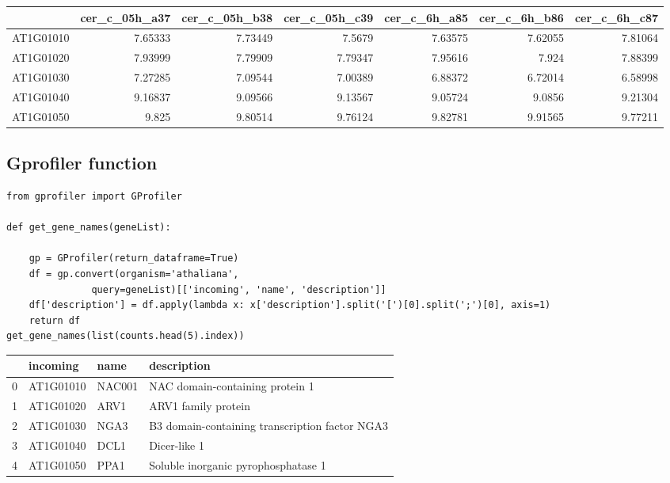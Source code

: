 \documentclass[11pt]{article}
\begin{document}
\begin{center}
\begin{tabular}{lrrrrrr}
 & cer\_c\_05h\_a37 & cer\_c\_05h\_b38 & cer\_c\_05h\_c39 & cer\_c\_6h\_a85 & cer\_c\_6h\_b86 & cer\_c\_6h\_c87\\
\hline
AT1G01010 & 7.65333 & 7.73449 & 7.5679 & 7.63575 & 7.62055 & 7.81064\\
AT1G01020 & 7.93999 & 7.79909 & 7.79347 & 7.95616 & 7.924 & 7.88399\\
AT1G01030 & 7.27285 & 7.09544 & 7.00389 & 6.88372 & 6.72014 & 6.58998\\
AT1G01040 & 9.16837 & 9.09566 & 9.13567 & 9.05724 & 9.0856 & 9.21304\\
AT1G01050 & 9.825 & 9.80514 & 9.76124 & 9.82781 & 9.91565 & 9.77211\\
\end{tabular}
\end{center}

\subsection{Gprofiler function}
\label{sec:org108e342}
\begin{verbatim}
from gprofiler import GProfiler

def get_gene_names(geneList):

    gp = GProfiler(return_dataframe=True)
    df = gp.convert(organism='athaliana',
               query=geneList)[['incoming', 'name', 'description']]
    df['description'] = df.apply(lambda x: x['description'].split('[')[0].split(';')[0], axis=1)
    return df
get_gene_names(list(counts.head(5).index))
\end{verbatim}

\begin{center}
\begin{tabular}{rlll}
 & incoming & name & description\\
\hline
0 & AT1G01010 & NAC001 & NAC domain-containing protein 1\\
1 & AT1G01020 & ARV1 & ARV1 family protein\\
2 & AT1G01030 & NGA3 & B3 domain-containing transcription factor NGA3\\
3 & AT1G01040 & DCL1 & Dicer-like 1\\
4 & AT1G01050 & PPA1 & Soluble inorganic pyrophosphatase 1\\
\end{tabular}
\end{center}
\end{document}
